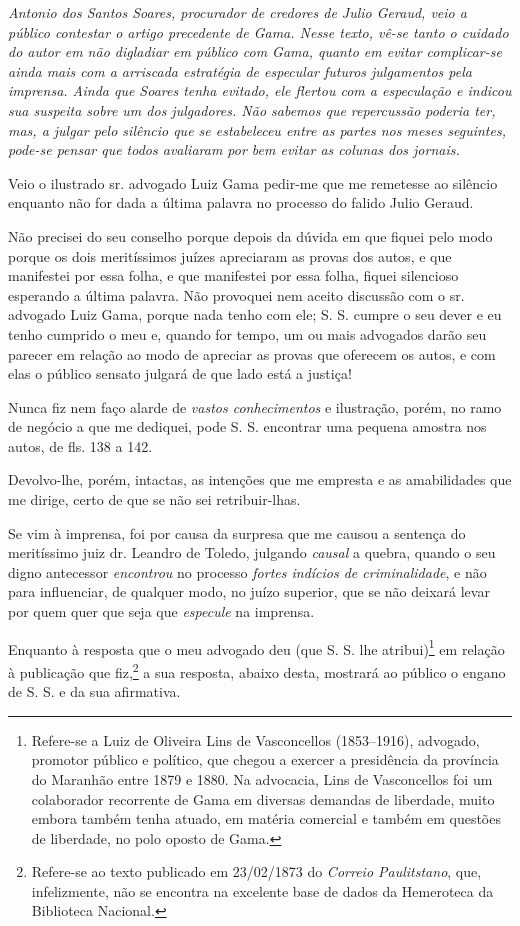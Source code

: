 \begin{didascalia}
\emph{Antonio dos Santos Soares, procurador de credores de Julio Geraud,
veio a público contestar o artigo precedente de Gama. Nesse texto, vê-se
tanto o cuidado do autor em não digladiar em público com Gama, quanto em
evitar complicar-se ainda mais com a arriscada estratégia de especular
futuros julgamentos pela imprensa. Ainda que Soares tenha evitado, ele
flertou com a especulação e indicou sua suspeita sobre um dos
julgadores. Não sabemos que repercussão poderia ter, mas, a julgar pelo
silêncio que se estabeleceu entre as partes nos meses seguintes, pode-se
pensar que todos avaliaram por bem evitar as colunas dos jornais.}
\end{didascalia}

Veio o ilustrado sr. advogado Luiz Gama pedir-me que me remetesse ao
silêncio enquanto não for dada a última palavra no processo do falido
Julio Geraud.

Não precisei do seu conselho porque depois da dúvida em que fiquei pelo
modo porque os dois meritíssimos juízes apreciaram as provas dos autos,
e que manifestei por essa folha, e que manifestei por essa folha, fiquei
silencioso esperando a última palavra. Não provoquei nem aceito
discussão com o sr. advogado Luiz Gama, porque nada tenho com ele; S. S.
cumpre o seu dever e eu tenho cumprido o meu e, quando for tempo, um ou
mais advogados darão seu parecer em relação ao modo de apreciar as
provas que oferecem os autos, e com elas o público sensato julgará de
que lado está a justiça!

Nunca fiz nem faço alarde de \emph{vastos conhecimentos} e ilustração,
porém, no ramo de negócio a que me dediquei, pode S. S. encontrar uma
pequena amostra nos autos, de fls. 138 a 142.

Devolvo-lhe, porém, intactas, as intenções que me empresta e as
amabilidades que me dirige, certo de que se não sei retribuir-lhas.

Se vim à imprensa, foi por causa da surpresa que me causou a sentença do
meritíssimo juiz dr. Leandro de Toledo, julgando \emph{causal} a quebra,
quando o seu digno antecessor \emph{encontrou} no processo \emph{fortes
indícios de criminalidade}, e não para influenciar, de qualquer modo, no
juízo superior, que se não deixará levar por quem quer que seja que
\emph{especule} na imprensa.

Enquanto à resposta que o meu advogado deu (que S. S. lhe
atribui)\footnote{ Refere-se a Luiz de Oliveira Lins de Vasconcellos
  (1853--1916), advogado, promotor público e político, que chegou a
  exercer a presidência da província do Maranhão entre 1879 e 1880. Na
  advocacia, Lins de Vasconcellos foi um colaborador recorrente de Gama
  em diversas demandas de liberdade, muito embora também tenha atuado,
  em matéria comercial e também em questões de liberdade, no polo oposto
  de Gama.} em relação à publicação que fiz,\footnote{ Refere-se ao
  texto publicado em 23/02/1873 do \emph{Correio Paulitstano}, que,
  infelizmente, não se encontra na excelente base de dados da Hemeroteca
  da Biblioteca Nacional.} a sua resposta, abaixo desta, mostrará ao
público o engano de S. S. e da sua afirmativa.

